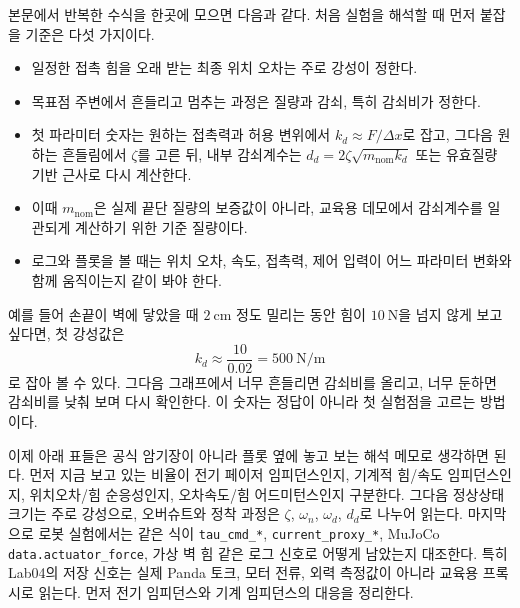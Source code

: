 본문에서 반복한 수식을 한곳에 모으면 다음과 같다.
처음 실험을 해석할 때 먼저 붙잡을 기준은 다섯 가지이다.
\begin{itemize}
  \item 일정한 접촉 힘을 오래 받는 최종 위치 오차는 주로 강성이 정한다.
  \item 목표점 주변에서 흔들리고 멈추는 과정은 질량과 감쇠, 특히 감쇠비가 정한다.
  \item 첫 파라미터 숫자는 원하는 접촉력과 허용 변위에서 $k_d \approx F/\Delta x$로 잡고, 그다음 원하는 흔들림에서 $\zeta$를 고른 뒤, 내부 감쇠계수는 $d_d=2\zeta\sqrt{m_{\mathrm{nom}}k_d}$ 또는 유효질량 기반 근사로 다시 계산한다.
  \item 이때 $m_{\mathrm{nom}}$은 실제 끝단 질량의 보증값이 아니라, 교육용 데모에서 감쇠계수를 일관되게 계산하기 위한 기준 질량이다.
  \item 로그와 플롯을 볼 때는 위치 오차, 속도, 접촉력, 제어 입력이 어느 파라미터 변화와 함께 움직이는지 같이 봐야 한다.
\end{itemize}

예를 들어 손끝이 벽에 닿았을 때 \(2~\mathrm{cm}\) 정도 밀리는 동안 힘이 \(10~\mathrm{N}\)을 넘지 않게 보고 싶다면, 첫 강성값은
\[
  k_d \approx \frac{10}{0.02}=500~\mathrm{N/m}
\]
로 잡아 볼 수 있다.
그다음 그래프에서 너무 흔들리면 감쇠비를 올리고, 너무 둔하면 감쇠비를 낮춰 보며 다시 확인한다.
이 숫자는 정답이 아니라 첫 실험점을 고르는 방법이다.

이제 아래 표들은 공식 암기장이 아니라 플롯 옆에 놓고 보는 해석 메모로 생각하면 된다.
먼저 지금 보고 있는 비율이 전기 페이저 임피던스인지, 기계적 힘/속도 임피던스인지, 위치오차/힘 순응성인지, 오차속도/힘 어드미턴스인지 구분한다.
그다음 정상상태 크기는 주로 강성으로, 오버슈트와 정착 과정은 \(\zeta\), \(\omega_n\), \(\omega_d\), \(d_d\)로 나누어 읽는다.
마지막으로 로봇 실험에서는 같은 식이 \texttt{tau\_cmd\_*}, \texttt{current\_proxy\_*}, MuJoCo \texttt{data.actuator\_force}, 가상 벽 힘 같은 로그 신호로 어떻게 남았는지 대조한다.
특히 Lab04의 저장 신호는 실제 Panda 토크, 모터 전류, 외력 측정값이 아니라 교육용 프록시로 읽는다.
먼저 전기 임피던스와 기계 임피던스의 대응을 정리한다.

